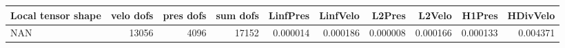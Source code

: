 \begin{tabular}{lrrrrrrrrr}
\toprule
Local tensor shape &  velo dofs &  pres dofs &  sum dofs &  LinfPres &  LinfVelo &   L2Pres &   L2Velo &   H1Pres &  HDivVelo \\
\midrule
               NAN &      13056 &       4096 &     17152 &  0.000014 &  0.000186 & 0.000008 & 0.000166 & 0.000133 &  0.004371 \\
\bottomrule
\end{tabular}
